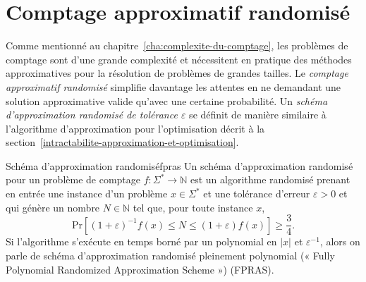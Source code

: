
\section{Comptage approximatif randomisé}
\label{sec:comptage-approximatif-randomise}

Comme mentionné au chapitre~\ref{cha:complexite-du-comptage}, les problèmes de comptage sont d'une grande complexité et nécessitent en pratique des méthodes approximatives pour la résolution de problèmes de grandes tailles. Le \textit{comptage approximatif randomisé} simplifie davantage les attentes en ne demandant une solution approximative valide qu'avec une certaine probabilité. Un \textit{schéma d'approximation randomisé de tolérance $\varepsilon$} se définit de manière similaire à l'algorithme d'approximation pour l'optimisation décrit à la section~\ref{intractabilite-approximation-et-optimisation}. 

\begin{maindefinition}{Schéma d'approximation randomisé}{fpras}
    Un schéma d'approximation randomisé pour un problème de comptage $f: \Sigma^{*} \to \mathbb{N}$ est un algorithme randomisé prenant en entrée une instance d'un problème $x \in \Sigma^{*}$ et une tolérance d'erreur $\varepsilon > 0$ et qui génère un nombre $N \in \mathbb{N}$ tel que, pour toute instance $x$,
    \begin{equation*}
        \mathrm{ Pr }\left[(1+\varepsilon)^{-1} f(x) \leq N \leq (1+\varepsilon)f(x)\right] \geq \frac{3}{4} .
    \end{equation*}
    Si l'algorithme s'exécute en temps borné par un polynomial en $\lvert x \rvert$ et $\varepsilon^{-1}$, alors on parle de schéma d'approximation randomisé pleinement polynomial (« Fully Polynomial Randomized Approximation Scheme ») (FPRAS).
\end{maindefinition}

